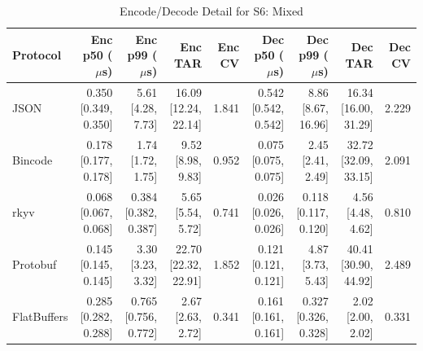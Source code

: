\begin{table}[htbp]
\centering
\caption{Encode/Decode Detail for S6: Mixed}
\label{tab:detail_mixed}
\begin{tabular}{l r r r r r r r r}
\hline
Protocol & Enc p50 ($\mu$s) & Enc p99 ($\mu$s) & Enc TAR & Enc CV & Dec p50 ($\mu$s) & Dec p99 ($\mu$s) & Dec TAR & Dec CV \\
\hline
  JSON & 0.350 [0.349, 0.350] & 5.61 [4.28, 7.73] & 16.09 [12.24, 22.14] & 1.841 & 0.542 [0.542, 0.542] & 8.86 [8.67, 16.96] & 16.34 [16.00, 31.29] & 2.229 \\
  Bincode & 0.178 [0.177, 0.178] & 1.74 [1.72, 1.75] & 9.52 [8.98, 9.83] & 0.952 & 0.075 [0.075, 0.075] & 2.45 [2.41, 2.49] & 32.72 [32.09, 33.15] & 2.091 \\
  rkyv & 0.068 [0.067, 0.068] & 0.384 [0.382, 0.387] & 5.65 [5.54, 5.72] & 0.741 & 0.026 [0.026, 0.026] & 0.118 [0.117, 0.120] & 4.56 [4.48, 4.62] & 0.810 \\
  Protobuf & 0.145 [0.145, 0.145] & 3.30 [3.23, 3.32] & 22.70 [22.32, 22.91] & 1.852 & 0.121 [0.121, 0.121] & 4.87 [3.73, 5.43] & 40.41 [30.90, 44.92] & 2.489 \\
  FlatBuffers & 0.285 [0.282, 0.288] & 0.765 [0.756, 0.772] & 2.67 [2.63, 2.72] & 0.341 & 0.161 [0.161, 0.161] & 0.327 [0.326, 0.328] & 2.02 [2.00, 2.02] & 0.331 \\
\hline
\end{tabular}
\end{table}